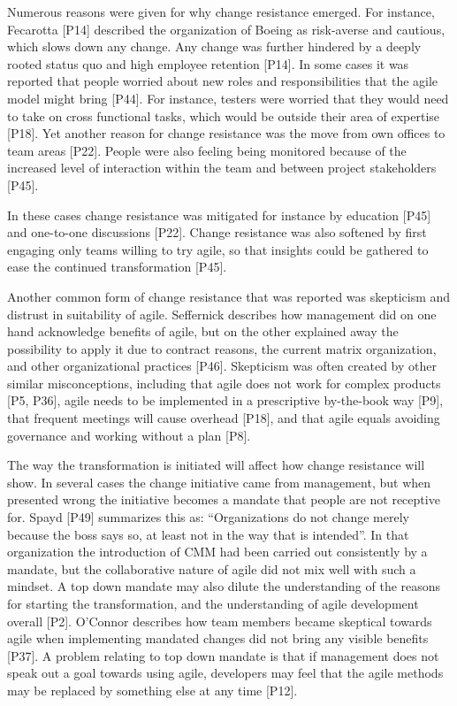 Numerous reasons were given for why change resistance emerged. For
instance, Fecarotta [P14] described the organization of Boeing as risk-averse
and cautious, which slows down any change. Any change was further hindered by a
deeply rooted status quo and high employee retention [P14]. In some cases it was
reported that people worried about new roles and responsibilities that the agile
model might bring [P44]. For instance, testers were worried that they would need
to take on cross functional tasks, which would be outside their area of
expertise [P18]. Yet another reason for change resistance was the move from own
offices to team areas [P22]. People were also feeling being monitored because of
the increased level of interaction within the team and between project
stakeholders [P45].

In these cases change resistance was mitigated for instance by education [P45]
and one-to-one discussions [P22]. Change resistance was also softened by first
engaging only teams willing to try agile, so that insights could be gathered to
ease the continued transformation [P45].

Another common form of change resistance that was reported was skepticism and
distrust in suitability of agile. Seffernick describes how management did on one hand
acknowledge benefits of agile, but on the other explained away the possibility
to apply it due to contract reasons, the current matrix organization, and other
organizational practices [P46]. Skepticism was often created by other similar
misconceptions, including that agile does not work for complex products [P5,
P36], agile needs to be implemented in a prescriptive by-the-book way [P9], that
frequent meetings will cause overhead [P18], and that agile equals avoiding
governance and working without a plan [P8].




The way the transformation is initiated will affect how change resistance will
show. In several cases the change initiative came from management, but when
presented wrong the initiative becomes a mandate that people are not receptive
for. Spayd [P49] summarizes this as: ``Organizations do not change merely
because the boss says so, at least not in the way that is intended''. In that
organization the introduction of CMM had been carried out consistently by a
mandate, but the collaborative nature of agile did not mix well with such a
mindset. A top down mandate may also dilute the understanding of the reasons for
starting the transformation, and the understanding of agile development overall
[P2]. O'Connor describes how team members became skeptical towards agile when
implementing mandated changes did not bring any visible benefits [P37].
A problem relating to top down mandate is that if management does not speak out
a goal towards using agile, developers may feel that the agile methods may be
replaced by something else at any time [P12].

